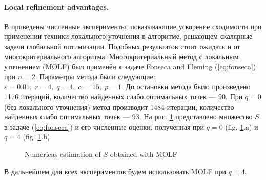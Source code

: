 \documentclass{llncs}
\begin{document}
\paragraph{Local refinement advantages.} В \cite{barkalovLebedev2016} приведены численные эксперименты, показывающие ускорение сходимости при применении техники локального уточнения в алгоритме, решающем скалярные задачи глобальной оптимизации. Подобных результатов стоит ожидать и от многокритериального алгоритма. Многокритериальный метод с локальным уточнением (MOLF) был применён к задаче Fonseca and Fleming (\ref{eq:fonseca}) при \(n=2\). Параметры метода были следующие: \(\varepsilon=0.01,\;r=4,\;q=4,\;\alpha=15,\;p=1\). До остановки метода было произведено 1176 итераций, количество найденных слабо оптимальных точек --- 90. При \(q=0\) (без локального уточнения) метод производит 1484 итерации, количество найденных слабо оптимальных точек --- 93. На рис. \ref{fig:fonseca_slater} представлено множество \(S\) в задаче (\ref{eq:fonseca}) и его численные оценки, полученная при \(q=0\) (fig. \ref{fig:fonseca_slater}.a) и \(q=4\) (fig. \ref{fig:fonseca_slater}.b).

\begin{figure}[ht]
    \centering
    \qquad
    \caption{Numericas estimation of \(S\) obtained with MOLF}
    \label{fig:fonseca_slater}
\end{figure}

В дальнейшем для всех экспериментов будем использовать MOLF при \(q=4\).
\end{document}
